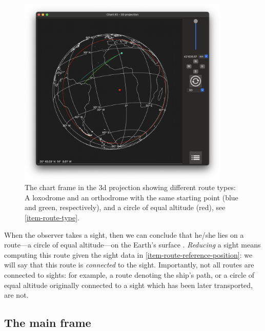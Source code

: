\documentclass{ol-softwaremanual}
\begin{document}
\begin{figure}
  \centering
  \includegraphics[width=0.9\textwidth]{figures/route-types.png}
  \caption{
    \label{fig-route-types}
    The chart frame in the 3d projection showing different route types: A loxodrome and an orthodrome with the same starting point (blue and green, respectively), and a circle of equal altitude (red), see \cref{item-route-type}. 
  }
  \end{figure}


When the observer takes a sight, then we can conclude that he/she lies on a route---a circle of equal altitude---on the Earth's surface \cite{bowditch2002the}. 
\textit{Reducing} a sight means computing this route given the sight data in \cref{item-route-reference-position}: we will say that this route is \textit{connected} to the sight. Importantly, not all routes are connected to sights: for example, a route denoting the ship's path, or a circle of equal altitude originally connected to a sight which has been later transported, are not. 

\subsection{The main frame}
\end{document}
